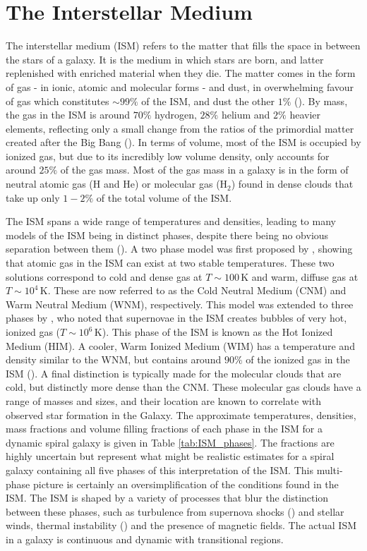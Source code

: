 \section{The Interstellar Medium}

The interstellar medium (ISM) refers to the matter that fills the space in between the stars of a galaxy. It is the medium in which stars are born, and latter replenished with enriched material when they die. The matter comes in the form of gas - in ionic, atomic and molecular forms - and dust, in overwhelming favour of gas which constitutes $\sim99\%$ of the ISM, and dust the other $1\%$ (\citealt{Ferriere_2001}). By mass, the gas in the ISM is around $70\%$ hydrogen, $28\%$ helium and $2\%$ heavier elements, reflecting only a small change from the ratios of the primordial matter created after the Big Bang (\citealt{Klessen_2016}). In terms of volume, most of the ISM is occupied by ionized gas, but due to its incredibly low volume density, only accounts for around $25\%$ of the gas mass. Most of the gas mass in a galaxy is in the form of neutral atomic gas (H and He) or molecular gas (H$_2$) found in dense clouds that take up only $1 - 2\%$ of the total volume of the ISM.

The ISM spans a wide range of temperatures and densities, leading to many models of the ISM being in distinct phases, despite there being no obvious separation between them (\citealt{Cox_2005}). A two phase model was first proposed by \citealt{Field_1969}, showing that atomic gas in the ISM can exist at two stable temperatures. These two solutions correspond to cold and dense gas at $T\sim100\,$K and warm, diffuse gas at $T\sim10^4\,$K. These are now referred to as the Cold Neutral Medium (CNM) and Warm Neutral Medium (WNM), respectively. This model was extended to three phases by \citealt{McKee_1977}, who noted that supernovae in the ISM creates bubbles of very hot, ionized gas ($T\sim10^6\,$K). This phase of the ISM is known as the Hot Ionized Medium (HIM). A cooler, Warm Ionized Medium (WIM) has a temperature and density similar to the WNM, but contains around $90\%$ of the ionized gas in the ISM (\citealt{Haffner_2009}). A final distinction is typically made for the molecular clouds that are cold, but distinctly more dense than the CNM. These molecular gas clouds have a range of masses and sizes, and their location are known to correlate with observed star formation in the Galaxy. The approximate temperatures, densities, mass fractions and volume filling fractions of each phase in the ISM for a dynamic spiral galaxy is given in Table \ref{tab:ISM_phases}. The fractions are highly uncertain but represent what might be realistic estimates for a spiral galaxy containing all five phases of this interpretation of the ISM. This multi-phase picture is certainly an oversimplification of the conditions found in the ISM. The ISM is shaped by a variety of processes that blur the distinction between these phases, such as turbulence from supernova shocks (\citealt{MacLow_2004}) and stellar winds, thermal instability (\citealt{Kritsuk_2002}) and the presence of magnetic fields. The actual ISM in a galaxy is continuous and dynamic with transitional regions.


